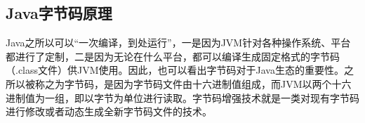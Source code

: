 \documentclass[../../../interview-questions.tex]{subfiles}
\begin{document}
\subsection{Java字节码原理}

Java之所以可以“一次编译，到处运行”，一是因为JVM针对各种操作系统、平台都进行了定制，二是因为无论在什么平台，都可以编译生成固定格式的字节码（.class文件）供JVM使用。因此，也可以看出字节码对于Java生态的重要性。之所以被称之为字节码，是因为字节码文件由十六进制值组成，而JVM以两个十六进制值为一组，即以字节为单位进行读取。字节码增强技术就是一类对现有字节码进行修改或者动态生成全新字节码文件的技术。
\end{document}
